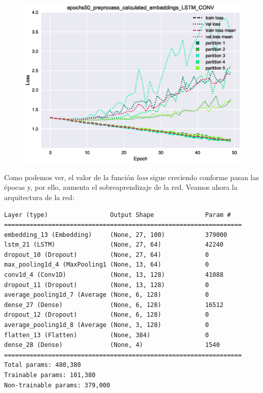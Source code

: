 \documentclass[11pt]{article}
\begin{document}
\begin{figure}[H]
\includegraphics[width=\linewidth]{images/loss/epochs50_preprocess_calculated_embeddings_LSTM_CONV-1554208880.eps}
\end{figure}

Como podemos ver, el valor de la función \textit{loss} sigue creciendo conforme pasan las épocas y, por ello, aumenta el sobreaprendizaje de la red. Veamos ahora la arquitectura de la red:

\begin{verbatim}
Layer (type)                 Output Shape              Param #   
=================================================================
embedding_13 (Embedding)     (None, 27, 100)           379000    
lstm_21 (LSTM)               (None, 27, 64)            42240     
dropout_10 (Dropout)         (None, 27, 64)            0         
max_pooling1d_4 (MaxPooling1 (None, 13, 64)            0         
conv1d_4 (Conv1D)            (None, 13, 128)           41088     
dropout_11 (Dropout)         (None, 13, 128)           0         
average_pooling1d_7 (Average (None, 6, 128)            0         
dense_27 (Dense)             (None, 6, 128)            16512     
dropout_12 (Dropout)         (None, 6, 128)            0         
average_pooling1d_8 (Average (None, 3, 128)            0         
flatten_13 (Flatten)         (None, 384)               0         
dense_28 (Dense)             (None, 4)                 1540      
=================================================================
Total params: 480,380
Trainable params: 101,380
Non-trainable params: 379,000
\end{verbatim}
\end{document}
